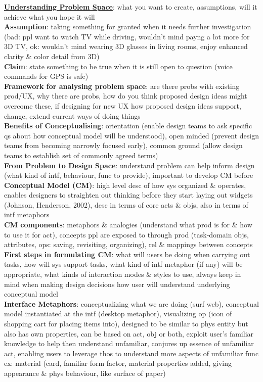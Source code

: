 \documentclass[a4paper]{article}
\begin{document}
\begin{multicols}{3}
        \underline{\textbf{Understanding Problem Space}}: what you want to create, assumptions, will it achieve what you hope it will\\
        \textbf{Assumption}: taking something for granted when it needs further investigation (bad: ppl want to watch TV while driving, wouldn't mind payng a lot more for 3D TV, ok: wouldn't mind wearing 3D glasses in living rooms, enjoy enhanced clarity \& color detail from 3D)\\
        \textbf{Claim}: state something to be true when it is still open to question (voice commands for GPS is safe)\\
        \textbf{Framework for analysing problem space}: are there probs with existing prod/UX, why there are probs, how do you think proposed design ideas might overcome these, if designing for new UX how proposed design ideas support, change, extend current ways of doing things\\
        \textbf{Benefits of Conceptualising}: orientation (enable design teams to ask specific qs about how conceptual model will be understood), open minded (prevent design teams from becoming narrowly focused early), common ground (allow design teams to establish set of commonly agreed terms)\\
        \textbf{From Problem to Design Space}: understand problem can help inform design (what kind of intf, behaviour, func to provide), important to develop CM before\\
        \textbf{Conceptual Model (CM)}: high level desc of how sys organized \& operates, enables designers to straighten out thinking before they start laying out widgets (Johnson, Henderson, 2002), desc in terms of core acts \& objs, also in terms of intf metaphors\\
        \textbf{CM components}: metaphors \& analogies (understand what prod is for \& how to use it for act), concepts ppl are exposed to through prod (task-domain objs, attributes, ops: saving, revisiting, organizing), rel \& mappings between concepts\\
        \textbf{First steps in formulating CM}: what will users be doing when carrying out tasks, how will sys support tasks, what kind of intf metaphor (if any) will be appropriate, what kinds of interaction modes \& styles to use, always keep in mind when making design decisions how user will understand underlying conceptual model\\
        \textbf{Interface Metaphors}: conceptualizing what we are doing (surf web), conceptual model instantiated at the intf (desktop metaphor), visualizing op (icon of shopping cart for placing items into), designed to be similar to phys entity but also has own properties, can be based on act, obj or both, exploit user's familiar knowledge to help then understand unfamiliar, conjures up essence of unfamiliar act, enabling users to leverage thos to understand more aspects of unfamiliar func ex: material (card, familiar form factor, material properties added, giving appearance \& phys behaviour, like surface of paper)\\

\end{multicols}
\end{document}
